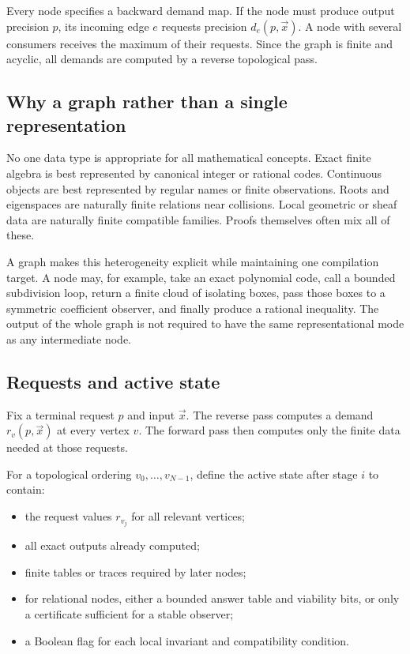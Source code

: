 Every node specifies a backward demand map.  If the node must produce output precision \(p\), its incoming edge \(e\) requests precision \(d_e(p,\vec{x})\).  A node with several consumers receives the maximum of their requests.  Since the graph is finite and acyclic, all demands are computed by a reverse topological pass.

\subsection{Why a graph rather than a single representation}

No one data type is appropriate for all mathematical concepts.  Exact finite algebra is best represented by canonical integer or rational codes.  Continuous objects are best represented by regular names or finite observations.  Roots and eigenspaces are naturally finite relations near collisions.  Local geometric or sheaf data are naturally finite compatible families.  Proofs themselves often mix all of these.

A graph makes this heterogeneity explicit while maintaining one compilation target.  A node may, for example, take an exact polynomial code, call a bounded subdivision loop, return a finite cloud of isolating boxes, pass those boxes to a symmetric coefficient observer, and finally produce a rational inequality.  The output of the whole graph is not required to have the same representational mode as any intermediate node.

\subsection{Requests and active state}

Fix a terminal request \(p\) and input \(\vec{x}\).  The reverse pass computes a demand \(r_v(p,\vec{x})\) at every vertex \(v\).  The forward pass then computes only the finite data needed at those requests.

For a topological ordering \(v_0,\ldots,v_{N-1}\), define the active state after stage \(i\) to contain:

\begin{itemize}
\item the request values \(r_{v_j}\) for all relevant vertices;
\item all exact outputs already computed;
\item finite tables or traces required by later nodes;
\item for relational nodes, either a bounded answer table and viability bits, or only a certificate sufficient for a stable observer;
\item a Boolean flag for each local invariant and compatibility condition.
\end{itemize}

